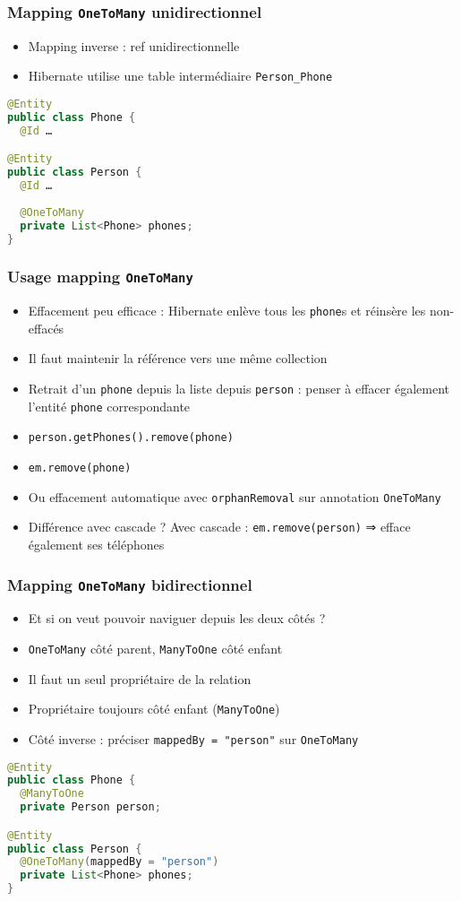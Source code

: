 \documentclass[english, french]{beamer}
\begin{document}
\begin{frame}[fragile]
	\frametitle{Mapping \texttt{OneToMany} unidirectionnel}
	\begin{itemize}
		\item Mapping inverse : ref  unidirectionnelle
		\item Hibernate utilise une table intermédiaire \texttt{Person\_Phone}%
	\end{itemize}
	\begin{lstlisting}[language=Java]
@Entity
public class Phone {
  @Id …

@Entity
public class Person {
  @Id …
  
  @OneToMany
  private List<Phone> phones;
}
	\end{lstlisting}
\end{frame}

\begin{frame}
	\frametitle{Usage mapping \texttt{OneToMany}}
	\begin{itemize}
		\item Effacement peu efficace : Hibernate enlève tous les \texttt{phone}s et réinsère les non-effacés
		\item Il faut maintenir la référence vers une même collection%
		\item Retrait d’un \texttt{phone} depuis la liste depuis \texttt{person} : penser à effacer également l’entité \texttt{phone} correspondante
		\item \texttt{person.getPhones().remove(phone)}
		\item \texttt{em.remove(phone)}
		\item Ou effacement automatique avec \texttt{orphanRemoval} sur annotation \texttt{OneToMany}
		\item Différence avec cascade ? \pause Avec cascade : \texttt{em.remove(person)} ⇒ efface également ses téléphones
	\end{itemize}
\end{frame}

\begin{frame}[fragile]
	\frametitle{Mapping \texttt{OneToMany} bidirectionnel}
	\begin{itemize}
		\item Et si on veut pouvoir naviguer depuis les deux côtés ?
		\item \texttt{OneToMany} côté parent, \texttt{ManyToOne} côté enfant
		\item Il faut un seul propriétaire de la relation
		\item Propriétaire toujours côté enfant (\texttt{ManyToOne})
		\item Côté inverse : préciser \texttt{mappedBy = "person"} sur \texttt{OneToMany}
	\end{itemize}
	\begin{lstlisting}[language=Java]
@Entity
public class Phone {
  @ManyToOne
  private Person person;

@Entity
public class Person {
  @OneToMany(mappedBy = "person")
  private List<Phone> phones;
}
	\end{lstlisting}
\end{frame}
\end{document}
